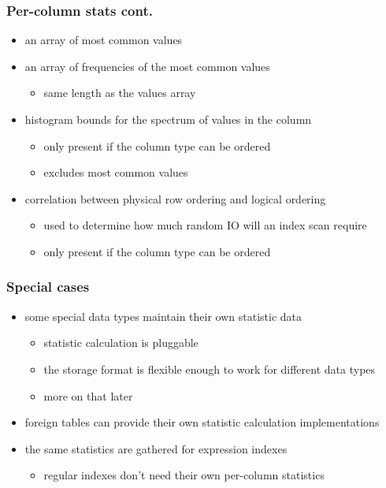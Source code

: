 \documentclass{beamer}
\begin{document}
\begin{frame}
  \frametitle{Per-column stats cont.}

  \begin{itemize}
  \item an array of \alert{most common} values
  \item an array of \alert{frequencies} of the most common values
    \begin{itemize}
    \item same length as the values array
    \end{itemize}
  \item \alert{histogram bounds} for the spectrum of values in the column
    \begin{itemize}
    \item only present if the column type can be \alert{ordered}
    \item excludes most common values
    \end{itemize}
  \item \alert{correlation} between physical row ordering and logical ordering
    \begin{itemize}
    \item used to determine how much random IO will an index scan require
    \item only present if the column type can be \alert{ordered}
    \end{itemize}
  \end{itemize}
\end{frame}

\begin{frame}
  \frametitle{Special cases}

  \begin{itemize}
  \item some \alert{special data types} maintain their own statistic data
    \begin{itemize}
    \item statistic calculation is \alert{pluggable}
    \item the storage format is \alert{flexible} enough to work for different data types
    \item more on that later
    \end{itemize}
  \item \alert{foreign tables} can provide their own statistic calculation implementations
  \item the same statistics are gathered for \alert{expression indexes}
    \begin{itemize}
    \item regular indexes don't need their own per-column statistics
    \end{itemize}
  \end{itemize}
\end{frame}
\end{document}
